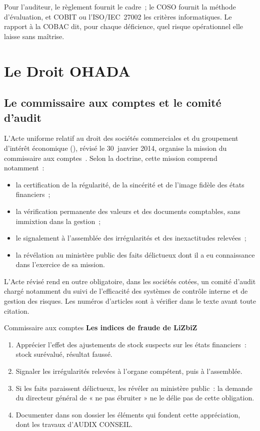 Pour l'auditeur, le règlement fournit le cadre~; le COSO fournit la
méthode d'évaluation, et COBIT ou l'ISO/IEC~27002 les critères
informatiques. Le rapport à la COBAC dit, pour chaque déficience, quel
risque opérationnel elle laisse sans maîtrise.

\section{Le Droit OHADA}
\label{sec:c12-ohada}

\subsection{Le commissaire aux comptes et le comité d'audit}

L'Acte uniforme relatif au droit des sociétés commerciales et du
groupement d'intérêt économique (), révisé le 30~janvier
2014, organise la mission du commissaire aux
comptes~\cite{ohada2014auscgie}. Selon la doctrine, cette mission
comprend notamment~:
\begin{itemize}
    \item la certification de la régularité, de la sincérité et de l'image
          fidèle des états financiers~;
    \item la vérification permanente des valeurs et des documents
          comptables, sans immixtion dans la gestion~;
    \item le signalement à l'assemblée des irrégularités et des
          inexactitudes relevées~;
    \item la révélation au ministère public des faits délictueux dont il a
          eu connaissance dans l'exercice de sa mission.
\end{itemize}
L'Acte révisé rend en outre obligatoire, dans les sociétés cotées, un
comité d'audit chargé notamment du suivi de l'efficacité des systèmes de
contrôle interne et de gestion des risques. Les numéros d'articles sont à
vérifier dans le texte avant toute citation.

\begin{boxmetier}{Commissaire aux comptes}
\textbf{Les indices de fraude de LiZbiZ}
\begin{enumerate}
    \item Apprécier l'effet des ajustements de stock suspects sur les états
          financiers~: stock surévalué, résultat faussé.
    \item Signaler les irrégularités relevées à l'organe compétent, puis à
          l'assemblée.
    \item Si les faits paraissent délictueux, les révéler au ministère
          public~: la demande du directeur général de « ne pas ébruiter »
          ne le délie pas de cette obligation.
    \item Documenter dans son dossier les éléments qui fondent cette
          appréciation, dont les travaux d'AUDIX CONSEIL.
\end{enumerate}
\end{boxmetier}

